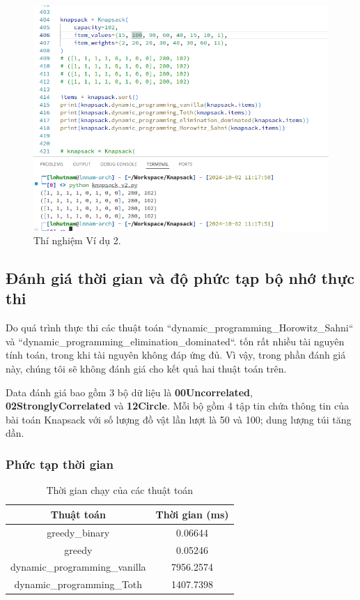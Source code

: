 \begin{figure}[H]
    \centering
    \includegraphics[width=1\columnwidth]{figures/vd2.png}
    \caption{Thí nghiệm Ví dụ 2.}
    \label{fig:test1}
\end{figure}


\subsection{Đánh giá thời gian và độ phức tạp bộ nhớ thực thi}
    Do quá trình thực thi các thuật toán ``dynamic\_programming\_Horowitz\_Sahni`` và ``dynamic\_programming\_elimination\_dominated``. tốn rất nhiều tài nguyên tính toán, trong khi tài nguyên không đáp ứng đủ. Vì vậy, trong phần đánh giá này, chúng tôi sẽ không đánh giá cho kết quả hai thuật toán trên.

    Data đánh giá bao gồm 3 bộ dữ liệu là \textbf{00Uncorrelated}, \textbf{02StronglyCorrelated} và \textbf{12Circle}. Mỗi bộ gồm 4 tập tin chứa thông tin của bài toán Knapsack với số lượng đồ vật lần lượt là 50 và 100; dung lượng túi tăng dần.

 \subsubsection{Phức tạp thời gian}

\begin{table}[H]
\centering
    \begin{tabular}{|c|c|}
    \hline
    \textbf{Thuật toán} & \textbf{Thời gian (ms)}           \\ \hline
    greedy\_binary      & 0.06644        \\ \hline
    greedy             & 0.05246         \\ \hline
    dynamic\_programming\_vanilla             & 7956.2574         \\ \hline
    dynamic\_programming\_Toth             & 1407.7398         \\ \hline
    \end{tabular}
    \caption{Thời gian chạy của các thuật toán}
\end{table}


